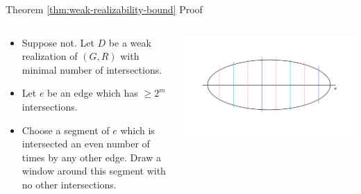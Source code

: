 \documentclass[10pt,aspectratio=169]{beamer}
\theoremstyle{plain}
\begin{document}
\begin{frame}{Theorem \ref{thm:weak-realizability-bound} Proof}
    \begin{columns}
    \begin{column}{0.35\textwidth}
        \begin{itemize}
            \item Suppose not. Let \(D\) be a weak realization of \((G, R)\) with minimal number of intersections.
            \item<2-> Let \(e\) be an edge which has \(\geq 2^m\) intersections.
            \item<3-> Choose a segment of \(e\) which is intersected an even number of times by any other edge. Draw a window around this segment with no other intersections.
        \end{itemize}
    \end{column}
    \begin{column}{0.65\textwidth}
        \begin{center}
            \includegraphics[width=\textwidth]{images/figure-4.pdf}
        \end{center}
    \end{column}
    \end{columns}
\end{frame}
\end{document}
